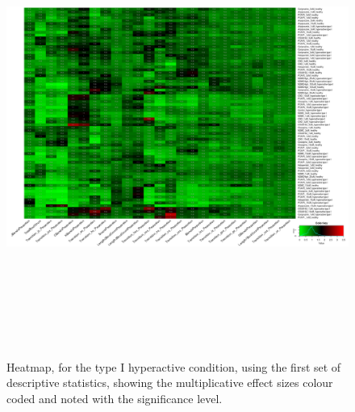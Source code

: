 \documentclass[a4paper,12pt]{article}
\begin{document}
\newpage
\begin{figure}[h!]
\begin{center}
\includegraphics[width=16cm,height=15cm]{DarkApoHigh_heatmap_all_DarkApoHigh_B2MAP.png}
\caption{Heatmap, for the type I hyperactive condition, using the first set of descriptive statistics, showing the multiplicative effect sizes colour coded and noted with the significance level.}
\end{center}
\end{figure}
\newpage
\end{document}
